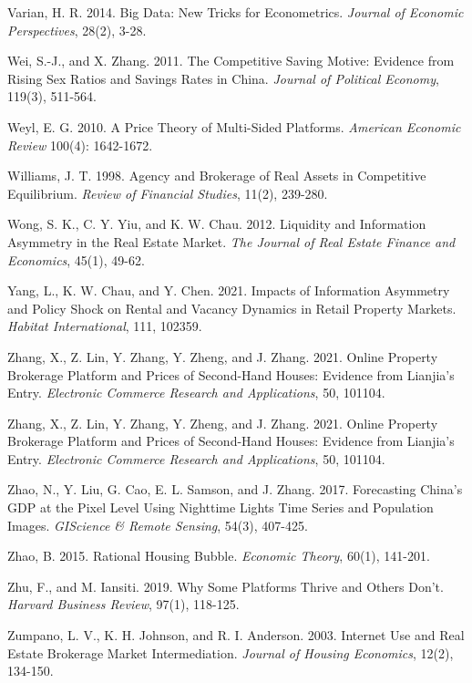 \documentclass[11pt]{article}
\begin{document}
\begin{singlespace}
\begin{thebibliography}{}
Varian, H. R. 2014. Big Data: New Tricks for Econometrics. \textit{Journal of Economic Perspectives}, 28(2), 3-28. 

Wei, S.-J., and X. Zhang. 2011. The Competitive Saving Motive: Evidence from Rising Sex Ratios and Savings Rates in China. \textit{Journal of Political Economy}, 119(3), 511-564. 

Weyl, E. G. 2010. A Price Theory of Multi-Sided Platforms. \textit{American Economic Review} 100(4): 1642-1672. %

Williams, J. T. 1998. Agency and Brokerage of Real Assets in Competitive Equilibrium. \textit{Review of Financial Studies}, 11(2), 239-280. 

Wong, S. K., C. Y. Yiu, and K. W. Chau. 2012. Liquidity and Information Asymmetry in the Real Estate Market. \textit{The Journal of Real Estate Finance and Economics}, 45(1), 49-62. 

Yang, L., K. W. Chau, and Y. Chen. 2021. Impacts of Information Asymmetry and Policy Shock on Rental and Vacancy Dynamics in Retail Property Markets. \textit{Habitat International}, 111, 102359. 

Zhang, X., Z. Lin, Y. Zhang, Y. Zheng, and J. Zhang. 2021. Online Property Brokerage Platform and Prices of Second-Hand Houses: Evidence from Lianjia's Entry. \textit{Electronic Commerce Research and Applications}, 50, 101104. 

Zhang, X., Z. Lin, Y. Zhang, Y. Zheng, and J. Zhang. 2021. Online Property Brokerage Platform and Prices of Second-Hand Houses: Evidence from Lianjia's Entry. \textit{Electronic Commerce Research and Applications}, 50, 101104. 

Zhao, N., Y. Liu, G. Cao, E. L. Samson, and J. Zhang. 2017. Forecasting China's GDP at the Pixel Level Using Nighttime Lights Time Series and Population Images. \textit{GIScience \& Remote Sensing}, 54(3), 407-425. 

Zhao, B. 2015. Rational Housing Bubble. \textit{Economic Theory}, 60(1), 141-201. 

Zhu, F., and M. Iansiti. 2019. Why Some Platforms Thrive and Others Don't. \textit{Harvard Business Review}, 97(1), 118-125. 

Zumpano, L. V., K. H. Johnson, and R. I. Anderson. 2003. Internet Use and Real Estate Brokerage Market Intermediation. \textit{Journal of Housing Economics}, 12(2), 134-150. 


  \end{thebibliography}
\end{singlespace}
\end{document}

